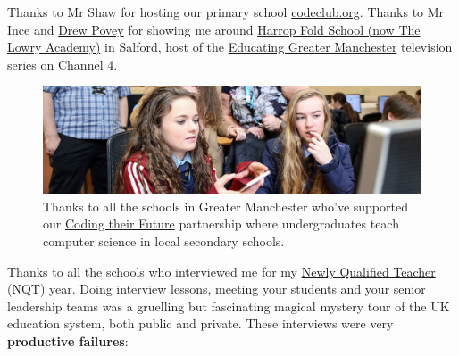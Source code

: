 \documentclass[
]{book}
\begin{document}
Thanks to Mr Shaw for hosting our primary school \href{https://codeclub.org/en/}{codeclub.org}. Thanks to Mr Ince and \href{https://www.digitalspy.com/tv/a34573273/educating-greater-manchester-drew-povey-resignation-explained/}{Drew Povey} for showing me around \href{https://en.wikipedia.org/wiki/The_Lowry_Academy}{Harrop Fold School (now The Lowry Academy)} in Salford, host of the \href{https://www.channel4.com/programmes/educating-greater-manchester}{Educating Greater Manchester} television series on Channel 4. \citep{povey}

\begin{figure}

{\centering \includegraphics[width=1\linewidth]{images/schools-banner} 

}

\caption{Thanks to all the schools in Greater Manchester who've supported our \href{https://personalpages.manchester.ac.uk/staff/duncan.hull/coding-their-future.html}{Coding their Future} partnership where undergraduates teach computer science in local secondary schools.}\label{fig:coding-their-future-fig}
\end{figure}



Thanks to all the schools who interviewed me for my \href{https://en.wikipedia.org/wiki/Newly_qualified_teacher}{Newly Qualified Teacher} (NQT) year. Doing interview lessons, meeting your students and your senior leadership teams was a gruelling but fascinating magical mystery tour of the UK education system, both public and private. These interviews were very \textbf{productive failures}:
\end{document}
